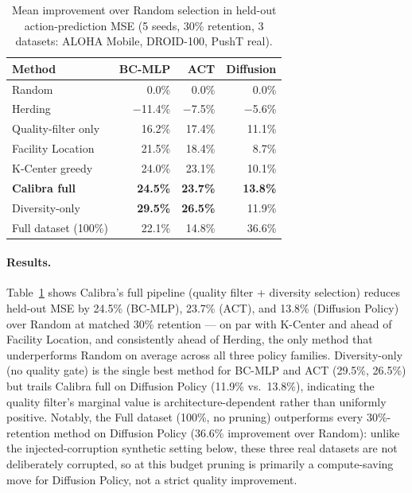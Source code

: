 \documentclass[10pt,twocolumn]{article}
\begin{document}
\begin{table}[h]
\centering
\caption{Mean improvement over Random selection in held-out action-prediction
MSE (5 seeds, 30\% retention, 3 datasets: ALOHA Mobile, DROID-100, PushT real).}
\label{tab:ablation}
\footnotesize
\begin{tabular}{lrrr}
\toprule
\textbf{Method} & \textbf{BC-MLP} & \textbf{ACT} & \textbf{Diffusion} \\
\midrule
Random               & 0.0\%   & 0.0\%   & 0.0\%   \\
Herding               & $-$11.4\% & $-$7.5\%  & $-$5.6\%  \\
Quality-filter only   & 16.2\%  & 17.4\%  & 11.1\%  \\
Facility Location     & 21.5\%  & 18.4\%  & 8.7\%   \\
K-Center greedy       & 24.0\%  & 23.1\%  & 10.1\%  \\
\textbf{Calibra full} & \textbf{24.5\%}  & \textbf{23.7\%}  & \textbf{13.8\%}  \\
Diversity-only        & \textbf{29.5\%}  & \textbf{26.5\%}  & 11.9\%  \\
\midrule
Full dataset (100\%)  & 22.1\%  & 14.8\%  & 36.6\%  \\
\bottomrule
\end{tabular}
\end{table}

\paragraph{Results.}
Table~\ref{tab:ablation} shows Calibra's full pipeline (quality filter +
diversity selection) reduces held-out MSE by 24.5\% (BC-MLP), 23.7\% (ACT),
and 13.8\% (Diffusion Policy) over Random at matched 30\% retention --- on
par with K-Center and ahead of Facility Location, and consistently ahead of
Herding, the only method that underperforms Random on average across all
three policy families. Diversity-only (no quality gate) is the single best
method for BC-MLP and ACT (29.5\%, 26.5\%) but trails Calibra full on
Diffusion Policy (11.9\% vs.\ 13.8\%), indicating the quality filter's
marginal value is architecture-dependent rather than uniformly positive.
Notably, the Full dataset (100\%, no pruning) outperforms every 30\%-retention
method on Diffusion Policy (36.6\% improvement over Random): unlike the
injected-corruption synthetic setting below, these three real datasets are
not deliberately corrupted, so at this budget pruning is primarily a
compute-saving move for Diffusion Policy, not a strict quality improvement.
\end{document}
